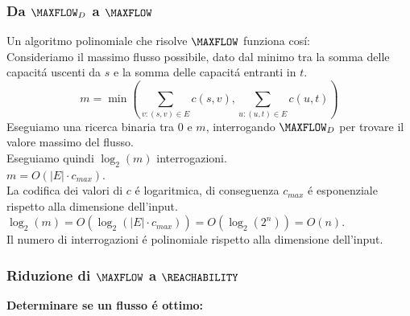\subsubsection{Da $\MAXFLOW_D$ a $\MAXFLOW$}
Un algoritmo polinomiale che risolve $\MAXFLOW$ funziona cosí: \\
Consideriamo il massimo flusso possibile, dato dal minimo tra la somma delle capacitá uscenti da $s$ e la somma delle capacitá entranti in $t$. \\
\[
m = \min\left(\sum_{v : (s,v) \in E} c(s, v), \sum_{u : (u, t) \in E} c(u, t)\right)
\]
Eseguiamo una ricerca binaria tra $0$ e $m$, interrogando $\MAXFLOW_D$ per trovare il valore massimo del flusso. \\
Eseguiamo quindi $\log_2(m)$ interrogazioni. \\
$m = O(|E| \cdot c_{max})$. \\
La codifica dei valori di $c$ é logaritmica, di conseguenza $c_{max}$ é esponenziale rispetto alla dimensione dell'input. \\
$\log_2(m) = O(\log_2(|E| \cdot c_{max})) = O(\log_2(2^n)) = O(n)$. \\
Il numero di interrogazioni é polinomiale rispetto alla dimensione dell'input.

\subsubsection{Riduzione di $\MAXFLOW$ a $\REACHABILITY$}
\label{riduzione:maxflow_reachability}

\textbf{Determinare se un flusso é ottimo:}

